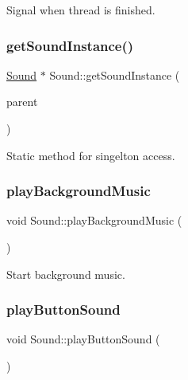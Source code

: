 Signal when thread is finished. 

\mbox{\label{class_sound_a2685a4d6cbb5b6f57c1a8880336c68a5}} 
\subsubsection{\texorpdfstring{getSoundInstance()}{getSoundInstance()}}
{\footnotesize\ttfamily \mbox{\hyperlink{class_sound}{Sound}} $\ast$ Sound\+::get\+Sound\+Instance (\begin{DoxyParamCaption}\item[{Q\+Object $\ast$}]{parent }\end{DoxyParamCaption})\hspace{0.3cm}{\ttfamily [static]}}



Static method for singelton access. 

\mbox{\label{class_sound_a38ddfc508820823a97a447bbcf13cdd6}} 
\subsubsection{\texorpdfstring{playBackgroundMusic}{playBackgroundMusic}}
{\footnotesize\ttfamily void Sound\+::play\+Background\+Music (\begin{DoxyParamCaption}{ }\end{DoxyParamCaption})\hspace{0.3cm}{\ttfamily [slot]}}



Start background music. 

\mbox{\label{class_sound_a0e86fca0cb1a60f07e93d58cda639d91}} 
\subsubsection{\texorpdfstring{playButtonSound}{playButtonSound}}
{\footnotesize\ttfamily void Sound\+::play\+Button\+Sound (\begin{DoxyParamCaption}{ }\end{DoxyParamCaption})\hspace{0.3cm}{\ttfamily [slot]}}



